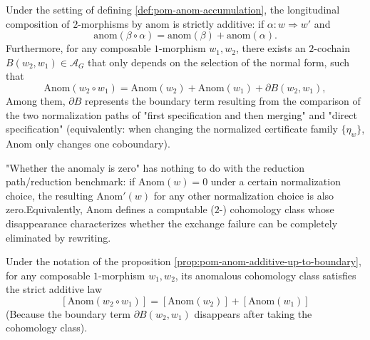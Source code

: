 \begin{proposition}\label{prop:pom-anom-additive-up-to-boundary}Under the setting of defining \ref{def:pom-anom-accumulation}, the longitudinal composition of \(2\)-morphisms by \(\mathrm{anom}\) is strictly additive: if \(\alpha:w\Rightarrow w'\) and\[
\mathrm{anom}(\beta\circ\alpha)=\mathrm{anom}(\beta)+\mathrm{anom}(\alpha).
\]
Furthermore, for any composable \(1\)-morphism \(w_1,w_2\), there exists an \(2\)-cochain \(B(w_2,w_1)\in\mathcal{A}_G\) that only depends on the selection of the normal form, such that\[
\mathrm{Anom}(w_2\circ w_1)
=
\mathrm{Anom}(w_2)+\mathrm{Anom}(w_1)+\partial B(w_2,w_1),
\]
Among them, \(\partial B\) represents the boundary term resulting from the comparison of the two normalization paths of "first specification and then merging" and "direct specification" (equivalently: when changing the normalized certificate family \(\{\eta_w\}\), \(\mathrm{Anom}\) only changes one coboundary).\end{proposition}

\begin{corollary}\label{cor:pom-anom-cohomology-class}"Whether the anomaly is zero" has nothing to do with the reduction path/reduction benchmark: if \(\mathrm{Anom}(w)=0\) under a certain normalization choice, the resulting \(\mathrm{Anom}'(w)\) for any other normalization choice is also zero.Equivalently, \(\mathrm{Anom}\) defines a computable (\(2\)-) cohomology class whose disappearance characterizes whether the exchange failure can be completely eliminated by rewriting.\end{corollary}

\begin{corollary}\label{cor:pom-anom-class-additive}Under the notation of the proposition \ref{prop:pom-anom-additive-up-to-boundary}, for any composable \(1\)-morphism \(w_1,w_2\), its anomalous cohomology class satisfies the strict additive law\[
\boxed{\;
[\mathrm{Anom}(w_2\circ w_1)]
=
[\mathrm{Anom}(w_2)]
+
[\mathrm{Anom}(w_1)]\;}
\]
(Because the boundary term \(\partial B(w_2,w_1)\) disappears after taking the cohomology class).\end{corollary}

